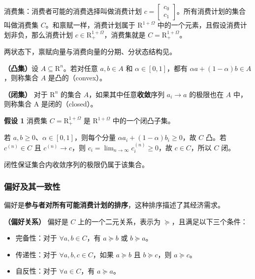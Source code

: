 \begin{tcolorbox}[knowledge,title=消费集]
消费集：消费者可能的消费选择叫做消费计划 $c=\begin{bmatrix}
    c_0 \\ c_1
\end{bmatrix}$。所有消费计划的集合叫做消费集 $C$。和禀赋一样，消费计划属于 $\mathrm{R}^{1+\Omega}$ 中的一个元素，且假设消费计划非负，那么消费计划 $c \in \mathrm{R}^{1+\Omega}_{+}$，消费集就是 $C=\mathrm{R}^{1+\Omega}_{+}$。
\end{tcolorbox}

两状态下，禀赋向量与消费向量的分期、分状态结构见。


\begin{tcolorbox}[knowledge]
\textbf{（凸集）}\quad 设 $A\subseteq\mathrm R^n$。若对任意 $a,b\in A$ 和 $\alpha\in[0,1]$，都有 $\alpha a+(1-\alpha)b\in A$，则称集合 $A$ 是凸的（convex）。
\end{tcolorbox}

\begin{tcolorbox}[knowledge]
\textbf{（闭集）} 对于 $\mathrm R^n$ 的集合 $A$，如果其中任意\textbf{收敛}序列 $a_i\to a$ 的极限也在 $A$ 中，则称集合 A 是闭的（closed）。
\end{tcolorbox}

\begin{tcolorbox}[knowledge]
\textbf{假设 1} 消费集 $C=\mathrm{R}^{1+\Omega}_{+}$ 是 $\mathrm{R}^{1+\Omega}$ 中的一个闭凸子集。
\end{tcolorbox}

\begin{solution}[label-content={证明},blank-type=none]
若 $a,b\ge0$、$\alpha\in[0,1]$，则每个分量 $\alpha a_i+(1-\alpha)b_i\ge0$，故 $C$ 凸。若 $c^{(n)}\in C$ 且 $c^{(n)}\to c$，则 $c_i=\lim_{n\to\infty}c_i^{(n)}\ge0$，故 $c\in C$，所以 $C$ 闭。
\end{solution}

闭性保证集合内收敛序列的极限仍属于该集合。

\subsubsection{偏好及其一致性}
偏好是\textbf{参与者对所有可能消费计划的排序}，这种排序描述了其经济需求。

\begin{tcolorbox}[knowledge]
\textbf{（偏好关系）} 偏好是 $C$ 上的一个二元关系，表示为 $\succeq$，且满足以下三个条件：
\begin{itemize}
    \item 完备性：对于 $\forall a,b \in C$，有 $a\succeq b$ 或 $b\succeq a$。
    \item 传递性：对于 $\forall a,b,c \in C$，如果 $a\succeq b$ 且 $b\succeq c$，则 $a\succeq c$。
    \item 自反性：对于 $\forall a \in C$，有 $a\succeq a$。
\end{itemize}
\end{tcolorbox}


